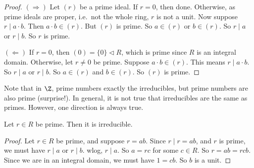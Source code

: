 \documentclass[a4paper]{article}
\begin{document}
\begin{proof}
  $(\Rightarrow)$ Let $(r)$ be a prime ideal. If $r = 0$, then done. Otherwise, as prime ideals are proper, i.e.\ not the whole ring, $r$ is not a unit. Now suppose $r \mid a \cdot b$. Then $a\cdot b \in (r)$. But $(r)$ is prime. So $a \in (r)$ or $b\in (r)$. So $r \mid a$ or $r \mid b$. So $r$ is prime.

  $(\Leftarrow)$ If $r = 0$, then $(0) = \{0\} \lhd R$, which is prime since $R$ is an integral domain. Otherwise, let $r \not= 0$ be prime. Suppose $a \cdot b \in (r)$. This means $r \mid a\cdot b$. So $r\mid a$ or $r \mid b$. So $a \in (r)$ and $b\in (r)$. So $(r)$ is prime.
\end{proof}

Note that in $\Z$, prime numbers exactly the irreducibles, but prime numbers are also prime (surprise!). In general, it is not true that irreducibles are the same as primes. However, one direction is always true.

\begin{lemma}
  Let $r \in R$ be prime. Then it is irreducible.
\end{lemma}

\begin{proof}
  Let $r \in R$ be prime, and suppose $r = ab$. Since $r \mid r = ab$, and $r$ is prime, we must have $r \mid a$ or $r \mid b$. wlog, $r\mid a$. So $a = rc$ for some $c \in R$. So $r = ab = rcb$. Since we are in an integral domain, we must have $1 = cb$. So $b$ is a unit.
\end{proof}
\end{document}
